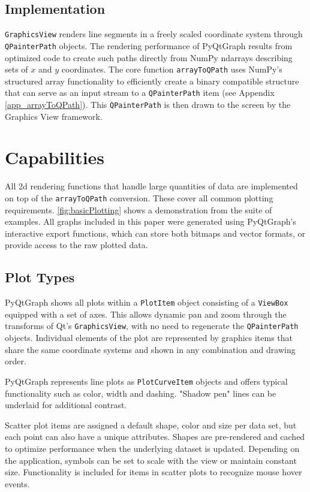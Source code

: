 \documentclass[journal]{vgtc}                %
\begin{document}
\subsection{Implementation}
\texttt{GraphicsView} renders line segments in a freely scaled coordinate system through \texttt{QPainterPath} objects. The rendering performance of PyQtGraph results from optimized code to create such paths directly from NumPy ndarrays describing sets of $x$ and $y$ coordinates. The core function \texttt{arrayToQPath} uses NumPy's structured array functionality to efficiently create a binary compatible structure that can serve as an input stream to a \texttt{QPainterPath} item (see Appendix \autoref{app_arrayToQPath}). This \texttt{QPainterPath} is then drawn to the screen by the Graphics View framework.

\section{Capabilities}

All 2d rendering functions that handle large quantities of data are implemented on top of the \texttt{arrayToQPath} conversion. These cover all common plotting requirements. \autoref{fig:basicPlotting} shows a demonstration from the suite of examples. All graphs included in this paper were generated using PyQtGraph's interactive export functions, which can store both bitmaps and vector formats, or provide access to the raw plotted data.

\subsection{Plot Types}

PyQtGraph shows all plots within a \texttt{PlotItem} object consisting of a \texttt{ViewBox} equipped with a set of axes. This allows dynamic pan and zoom through the transforms of Qt's \texttt{GraphicsView}, with no need to regenerate the \texttt{QPainterPath} objects. Individual elements of the plot are represented by graphics items that share the same coordinate systems and shown in any combination and drawing order. 

PyQtGraph represents line plots as \texttt{PlotCurveItem} objects and offers typical functionality such as color, width and dashing. "Shadow pen" lines can be underlaid for additional contrast. 

Scatter plot items are assigned a default shape, color and size per data set, but each point can also have a unique attributes. Shapes are pre-rendered and cached to optimize performance when the underlying dataset is updated. Depending on the application, symbols can be set to scale with the view or maintain constant size.  Functionality is included for items in scatter plots to recognize mouse hover events.
\end{document}
